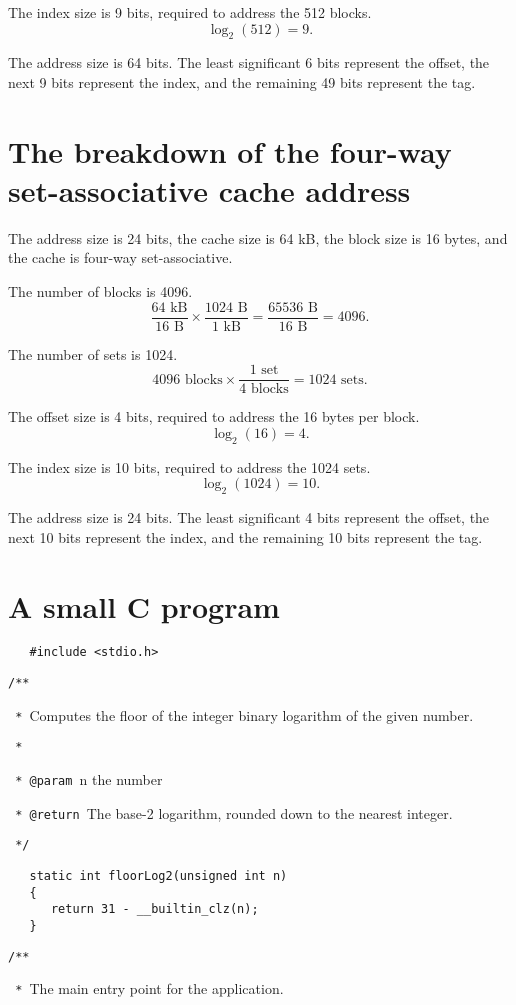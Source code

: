 \documentclass[12pt]{article}
\begin{document}
The index size is 9 bits, required to address the 512 blocks.
\[\log_2(512)=9.\]

The address size is 64 bits. The least significant 6 bits represent the offset, the next 9 bits represent the index, and the remaining 49 bits represent the tag.
\section{The breakdown of the four-way set-associative cache address}
The address size is 24 bits, the cache size is 64 kB, the block size is 16 bytes, and the cache is four-way set-associative.

The number of blocks is 4096.
\[\frac{64\text{ kB}}{16\text{ B}}\times\frac{1024\text{ B}}{1\text{ kB}}=\frac{65536\text{ B}}{16\text{ B}}=4096.\]

The number of sets is 1024.
\[4096\text{ blocks}\times\frac{1\text{ set}}{4\text{ blocks}}=1024\text{ sets}.\]

The offset size is 4 bits, required to address the 16 bytes per block.
\[\log_2(16)=4.\]

The index size is 10 bits, required to address the 1024 sets.
\[\log_2(1024)=10.\]

The address size is 24 bits. The least significant 4 bits represent the offset, the next 10 bits represent the index, and the remaining 10 bits represent the tag.
\section{A small C program}
\begin{verbatim}
   #include <stdio.h>
\end{verbatim}

\verb|/**|

\verb| * |Computes the floor of the integer binary logarithm of the given number.

\verb| * |

\verb| * @param |n the number

\verb| * @return |The base-2 logarithm, rounded down to the nearest integer.

\verb| */|
\begin{verbatim}
   static int floorLog2(unsigned int n)
   {
      return 31 - __builtin_clz(n);
   }
\end{verbatim}

\verb|/**|

\verb| * |The main entry point for the application.
\end{document}
